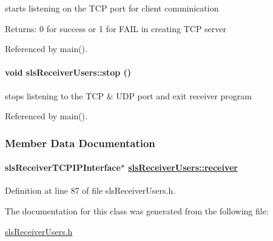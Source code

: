 starts listening on the TCP port for client comminication \begin{Desc}
\item[Returns:]0 for success or 1 for FAIL in creating TCP server \end{Desc}


Referenced by main().\hypertarget{classslsReceiverUsers_394001d873a4b7912865a971d4d25f87}{
\paragraph[stop]{\setlength{\rightskip}{0pt plus 5cm}void sls\-Receiver\-Users::stop ()}\hfill}
\label{classslsReceiverUsers_394001d873a4b7912865a971d4d25f87}


stops listening to the TCP \& UDP port and exit receiver program 

Referenced by main().

\subsubsection{Member Data Documentation}
\hypertarget{classslsReceiverUsers_8f262724fb99ecd3976214710d82dd18}{
\paragraph[receiver]{\setlength{\rightskip}{0pt plus 5cm}sls\-Receiver\-TCPIPInterface$\ast$ \hyperlink{classslsReceiverUsers_8f262724fb99ecd3976214710d82dd18}{sls\-Receiver\-Users::receiver}}\hfill}
\label{classslsReceiverUsers_8f262724fb99ecd3976214710d82dd18}




Definition at line 87 of file sls\-Receiver\-Users.h.

The documentation for this class was generated from the following file:\begin{CompactItemize}
\item 
\hyperlink{slsReceiverUsers_8h}{sls\-Receiver\-Users.h}\end{CompactItemize}
